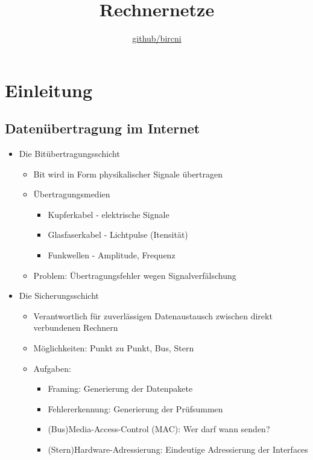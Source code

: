 \documentclass{scrreprt}
\title{Rechnernetze}
\author{\href{https://github.com/bircni}{\color{black}github/bircni}}
\date{}
\begin{document}
\maketitle
\pagebreak
\renewcommand{\contentsname}{Inhaltsverzeichnis}
\setcounter{tocdepth}{1}
\tableofcontents
{}
\pagebreak
{}
\chapter{Einleitung}
\section{Datenübertragung im Internet}
\begin{itemize}
	\item Die Bitübertragungsschicht
	\begin{itemize}
		\item Bit wird in Form physikalischer Signale übertragen
		\item Übertragungsmedien
		\begin{itemize}
			\item Kupferkabel - elektrische Signale
			\item Glasfaserkabel - Lichtpulse (Itensität)
			\item Funkwellen - Amplitude, Frequenz
		\end{itemize}
		\item Problem: Übertragungsfehler wegen Signalverfälschung
	\end{itemize}
	\item Die Sicherungsschicht
	\begin{itemize}
		\item Verantwortlich für zuverlässigen Datenaustausch zwischen direkt verbundenen Rechnern
		\item Möglichkeiten: Punkt zu Punkt, Bus, Stern
		\item Aufgaben:
		\begin{itemize}
			\item Framing: Generierung der Datenpakete
			\item Fehlererkennung: Generierung der Prüfsummen
			\item (Bus)Media-Access-Control (MAC): Wer darf wann senden?
			\item (Stern)Hardware-Adressierung: Eindeutige Adressierung der Interfaces
		\end{itemize}

\end{itemize}
\end{itemize}
\end{document}
